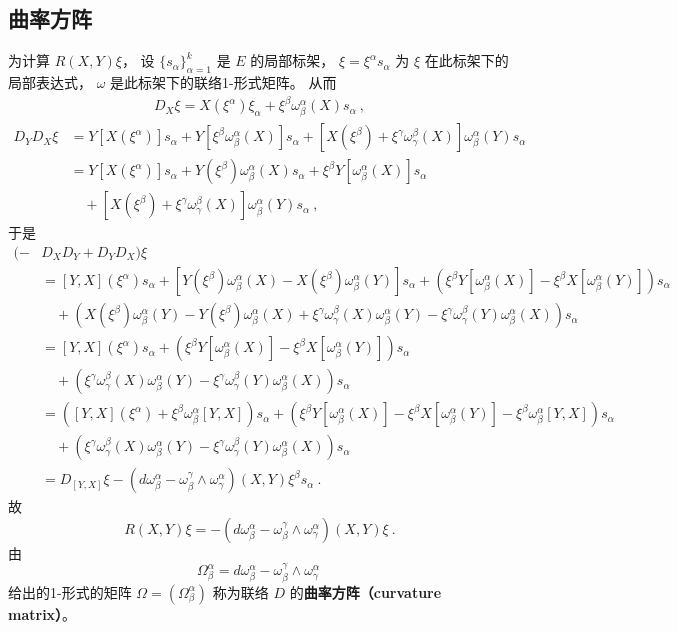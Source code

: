 \subsection{曲率方阵}
为计算 $R(X,Y)\xi$， 设 $\{s_\alpha\}_{\alpha=1}^k$ 是 $E$ 的局部标架， $\xi=\xi^\alpha s_\alpha$ 为 $\xi$ 在此标架下的局部表达式， $\omega$ 是此标架下的联络1-形式矩阵。 从而
$$
\begin{aligned}
D_X\xi=X(\xi^\alpha)\xi_\alpha+\xi^\beta\omega_\beta^\alpha(X) s_\alpha~,
\end{aligned}
$$
$$
\begin{aligned}
D_YD_X\xi&=Y[X(\xi^\alpha)]s_\alpha+Y[\xi^\beta\omega_\beta^\alpha(X)] s_\alpha
+[X(\xi^\beta)+\xi^\gamma\omega_\gamma^\beta(X)]\omega_\beta^\alpha(Y) s_\alpha \\
&=Y[X(\xi^\alpha)]s_\alpha+Y(\xi^\beta)\omega_\beta^\alpha(X)s_\alpha+\xi^\beta Y[\omega_\beta^\alpha(X)]s_\alpha\\
&\quad+[X(\xi^\beta)+\xi^\gamma\omega_\gamma^\beta(X)]\omega_\beta^\alpha(Y) s_\alpha ~,
\end{aligned}
$$
于是
$$
\begin{aligned}
(-&D_XD_Y+D_YD_X)\xi\\
&=[Y,X](\xi^\alpha)s_\alpha
+[Y(\xi^\beta)\omega_\beta^\alpha(X)-X(\xi^\beta)\omega_\beta^\alpha(Y)]s_\alpha+\left(\xi^\beta Y[\omega_\beta^\alpha(X)]-\xi^\beta X[\omega_\beta^\alpha(Y)]\right)s_\alpha\\
&\quad+\left(X(\xi^\beta)\omega_\beta^\alpha(Y)-Y(\xi^\beta)\omega_\beta^\alpha(X)+\xi^\gamma\omega_\gamma^\beta(X)\omega_\beta^\alpha(Y)-\xi^\gamma\omega_\gamma^\beta(Y)\omega_\beta^\alpha(X) \right)s_\alpha\\
&=[Y,X](\xi^\alpha)s_\alpha+\left(\xi^\beta Y[\omega_\beta^\alpha(X)]-\xi^\beta X[\omega_\beta^\alpha(Y)]\right)s_\alpha\\
&\quad+\left(\xi^\gamma\omega_\gamma^\beta(X)\omega_\beta^\alpha(Y)-\xi^\gamma\omega_\gamma^\beta(Y)\omega_\beta^\alpha(X) \right)s_\alpha\\
&=\left([Y,X](\xi^\alpha)+\xi^\beta\omega_\beta^\alpha[Y,X]\right)s_\alpha
+\left(\xi^\beta Y[\omega_\beta^\alpha(X)]-\xi^\beta X[\omega_\beta^\alpha(Y)]-\xi^\beta\omega_\beta^\alpha[Y,X]\right)s_\alpha\\
&\quad+\left(\xi^\gamma\omega_\gamma^\beta(X)\omega_\beta^\alpha(Y)-\xi^\gamma\omega_\gamma^\beta(Y)\omega_\beta^\alpha(X) \right)s_\alpha\\
&=D_{[Y,X]}\xi-(d\omega_\beta^\alpha-\omega_\beta^\gamma\wedge\omega_\gamma^\alpha)(X,Y)\xi^\beta s_\alpha~.
\end{aligned}
$$
故
$$
R(X,Y)\xi=-(d\omega_\beta^\alpha-\omega_\beta^\gamma\wedge\omega_\gamma^\alpha)(X,Y)\xi~.
$$
由
$$
\Omega_\beta^\alpha=d\omega_\beta^\alpha-\omega_\beta^\gamma\wedge\omega_\gamma^\alpha~
$$
给出的1-形式的矩阵 $\Omega=(\Omega_\beta^\alpha)$ 称为联络 $D$ 的\textbf{曲率方阵（curvature matrix）}。 

